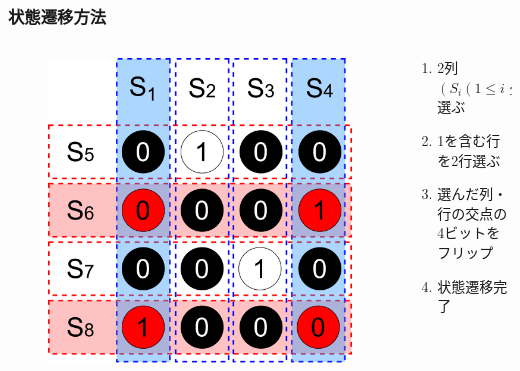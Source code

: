 \begin{frame}
  \frametitle{状態遷移方法}
  \begin{columns}
    \begin{column}{0.6\linewidth}
  \begin{figure}[h]
    \centering
    \includegraphics[width=0.8\linewidth]{data/kanzen2ji_bitflip}
  \end{figure}
    \end{column}
    \begin{column}{0.4\linewidth}
      \begin{enumerate}
        \item 2列$\left(S_i(1\leq i \leq 4)\right)$選ぶ
        \item 1を含む行を2行選ぶ
        \item 選んだ列・行の交点の4ビットをフリップ
        \item 状態遷移完了
      \end{enumerate}
    \end{column}
  \end{columns}
\end{frame}


